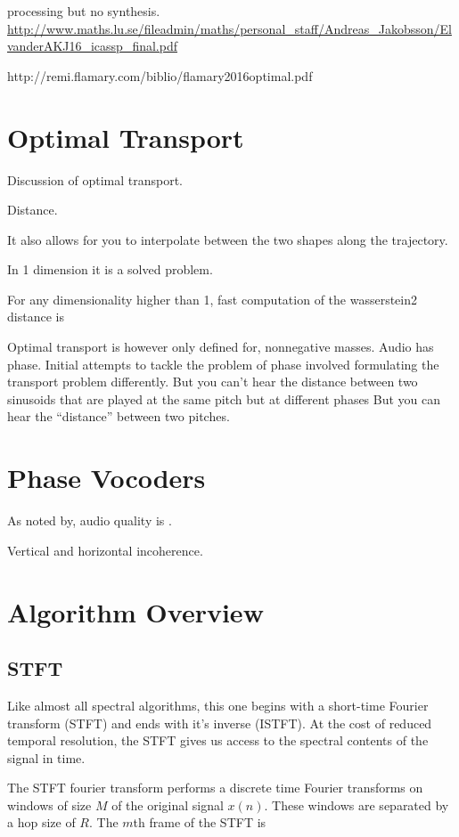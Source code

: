 \documentclass[12pt]{article}
\begin{document}
processing but no synthesis.
\url{http://www.maths.lu.se/fileadmin/maths/personal_staff/Andreas_Jakobsson/ElvanderAKJ16_icassp_final.pdf}

http://remi.flamary.com/biblio/flamary2016optimal.pdf

\section{Optimal Transport}

Discussion of optimal transport.

Distance. 

It also allows for you to interpolate between the two shapes along the trajectory.

In 1 dimension it is a solved problem.

For any dimensionality higher than 1, fast computation of the wasserstein2 distance is 

Optimal transport is however only defined for, nonnegative masses.
Audio has phase.
Initial attempts to tackle the problem of phase involved formulating the transport problem differently.
But you can't hear the distance between two sinusoids that are played at the same pitch but at different phases
But you can hear the ``distance'' between two pitches.

\section{Phase Vocoders}
As noted by, 
audio quality is .

Vertical and horizontal incoherence.


\section{Algorithm Overview}

\subsection{STFT}

Like almost all spectral algorithms, this one begins with a short-time Fourier transform (STFT) and ends with it's inverse (ISTFT).
At the cost of reduced temporal resolution, the STFT gives us access to the spectral contents of the signal in time.

The STFT fourier transform performs a discrete time Fourier transforms on windows of size $M$ of the original signal $x(n)$. 
These windows are separated by a hop size of $R$. The $m$th frame of the STFT is
\end{document}
